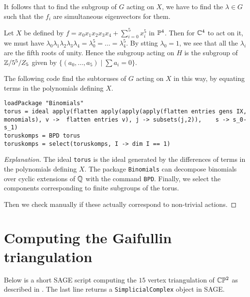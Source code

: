It follows that to find the subgroup of $G$ acting on $X$, we have to find the $\lambda \in G$ such that the $f_i$ are simultaneous eigenvectors for them.

\begin{example}
Let  $X$ be defined by $f = x_0x_1x_2x_3x_4+\sum_{i=0}^5 x_i^5$ in $\P^4$. Then for $\C^4$ to act on it, we must have $\lambda_0\lambda_1\lambda_2\lambda_3\lambda_4=\lambda_0^5=\ldots=\lambda_4^5$. By stting $\lambda_0=1$, we see that all the $\lambda_i$ are the fifth roots of unity. Hence the subgroup acting on $H$ is the subgroup of $\Z/5^5/Z_5$ given by $\{ (a_0,\ldots,a_5) \mid \sum a_i = 0 \}$.
\end{example}

The following code find the subtoruses of $G$ acting on $X$ in this way, by equating terms in the polynomials defining $X$.

\begin{lstlisting}[language=Macaulay2]
loadPackage "Binomials"
torus = ideal apply(flatten apply(apply(apply(flatten entries gens IX, monomials), v ->  flatten entries v), j -> subsets(j,2)),    s -> s_0-s_1)
toruskomps = BPD torus
toruskomps = select(toruskomps, I -> dim I == 1)
\end{lstlisting}
\begin{proof}[Explanation]
The ideal \texttt{torus} is the ideal generated by the differences of terms in the polynomials defining $X$. The \MM package \texttt{Binomials} can decompose binomials over cyclic extensions of $\Q$ with the command \texttt{BPD}. Finally, we select the components corresponding to finite subgroups of the torus.

Then we check manually if these actually correspond to non-trivial actions.
\end{proof}


\section{Computing the Gaifullin triangulation}
\label{sec:compute_gaifullin}

Below is a short SAGE script computing the $15$ vertex triangulation of $\C \P^2$ as described in \cite{cp2_15_chess}. The last line returns a \texttt{SimplicialComplex} object in SAGE.

